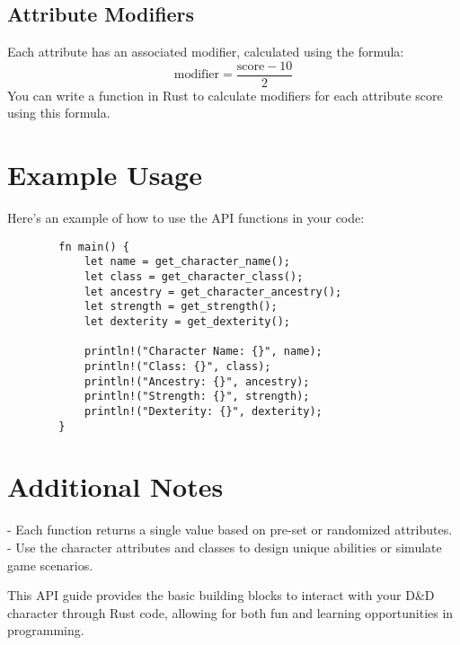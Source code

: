 \documentclass{article}
\begin{document}
	\subsection*{Attribute Modifiers}
	Each attribute has an associated modifier, calculated using the formula:
	\[
	\text{modifier} = \frac{\text{score} - 10}{2}
	\]
	You can write a function in Rust to calculate modifiers for each attribute score using this formula.
	
	\section*{Example Usage}
	Here’s an example of how to use the API functions in your code:
	
	\begin{lstlisting}
		fn main() {
			let name = get_character_name();
			let class = get_character_class();
			let ancestry = get_character_ancestry();
			let strength = get_strength();
			let dexterity = get_dexterity();
			
			println!("Character Name: {}", name);
			println!("Class: {}", class);
			println!("Ancestry: {}", ancestry);
			println!("Strength: {}", strength);
			println!("Dexterity: {}", dexterity);
		}
	\end{lstlisting}
	
	\section*{Additional Notes}
	- Each function returns a single value based on pre-set or randomized attributes.
	- Use the character attributes and classes to design unique abilities or simulate game scenarios.
	
	This API guide provides the basic building blocks to interact with your D\&D character through Rust code, allowing for both fun and learning opportunities in programming.
	
\end{document}
